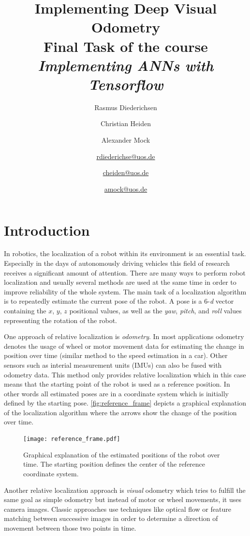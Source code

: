 \documentclass[a4paper,11pt]{article}
\title{Implementing Deep Visual Odometry\\{\large Final Task of the course \emph{Implementing ANNs with Tensorflow}}}
\author{Rasmus Diederichsen \and Christian Heiden \and Alexander Mock\\\and \href{mailto:rdiederichse@uos.de}{rdiederichse@uos.de}\and \href{mailto:cheiden@uos.de}{cheiden@uos.de} \and \href{mailto:amock@uos.de}{amock@uos.de}}
\begin{document}
\maketitle


\section{Introduction}
\label{sec:introduction}
In robotics, the localization of a robot within its environment is an essential task. Especially in the days of autonomously driving vehicles this field of research receives a significant amount of attention. There are many ways to perform robot localization and usually several methods are used at the same time in order to improve reliability of the whole system. The main task of a localization algorithm is to repeatedly estimate the current pose of the robot. A pose is a 6-\emph{d} vector containing the $x$, $y$, $z$ positional values, as well as the \emph{yaw}, \emph{pitch}, and \emph{roll} values representing the rotation of the robot.

One approach of relative localization is \emph{odometry}. In most applications
odometry denotes the usage of wheel or motor movement data for estimating the
change in position over time (similar method to the speed estimation in a car).
Other sensors such as interial measurement units (IMUs) can also be fused with
odometry data. This method only provides relative localization which in this
case means that the starting point of the robot is used as a reference position.
In other words all estimated poses are in a coordinate system which is initially
defined by the starting pose. \autoref{fig:reference_frame} depicts a
graphical explanation of the localization algorithm where the arrows show the
change of the position over time.


\begin{figure}[tbh]
    \centering
    \texttt{[image: reference\_frame.pdf]}
    \caption{Graphical explanation of the estimated positions of the robot over time. The starting position defines the center of the reference coordinate system.}
    \label{fig:reference_frame}
\end{figure}

Another relative localization approach is \emph{visual} odometry which tries to
fulfill the same goal as simple odometry but instead of motor or wheel
movements, it uses camera images. Classic approaches use techniques like optical
flow or feature matching between successive images in order to determine a
direction of movement between those two points in time.
\end{document}
